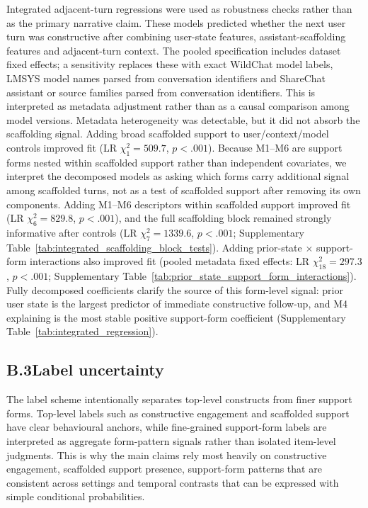 Integrated adjacent-turn regressions were used as robustness checks rather than as the primary narrative claim. These models predicted whether the next user turn was constructive after combining user-state features, assistant-scaffolding features and adjacent-turn context. The pooled specification includes dataset fixed effects; a sensitivity replaces these with exact WildChat model labels, LMSYS model names parsed from conversation identifiers and ShareChat assistant or source families parsed from conversation identifiers. This is interpreted as metadata adjustment rather than as a causal comparison among model versions. Metadata heterogeneity was detectable, but it did not absorb the scaffolding signal. Adding broad scaffolded support to user/context/model controls improved fit (LR $\chi^2_1=509.7$, $p<.001$). Because M1--M6 are support forms nested within scaffolded support rather than independent covariates, we interpret the decomposed models as asking which forms carry additional signal among scaffolded turns, not as a test of scaffolded support after removing its own components. Adding M1--M6 descriptors within scaffolded support improved fit (LR $\chi^2_6=829.8$, $p<.001$), and the full scaffolding block remained strongly informative after controls (LR $\chi^2_7=1339.6$, $p<.001$; Supplementary Table~\ref{tab:integrated_scaffolding_block_tests}). Adding prior-state $\times$ support-form interactions also improved fit (pooled metadata fixed effects: LR $\chi^2_{18}=297.3$, $p<.001$; Supplementary Table~\ref{tab:prior_state_support_form_interactions}). Fully decomposed coefficients clarify the source of this form-level signal: prior user state is the largest predictor of immediate constructive follow-up, and M4 explaining is the most stable positive support-form coefficient (Supplementary Table~\ref{tab:integrated_regression}).

\subsection*{B.3\quad Label uncertainty}

The label scheme intentionally separates top-level constructs from finer support forms. Top-level labels such as constructive engagement and scaffolded support have clear behavioural anchors, while fine-grained support-form labels are interpreted as aggregate form-pattern signals rather than isolated item-level judgments. This is why the main claims rely most heavily on constructive engagement, scaffolded support presence, support-form patterns that are consistent across settings and temporal contrasts that can be expressed with simple conditional probabilities.

